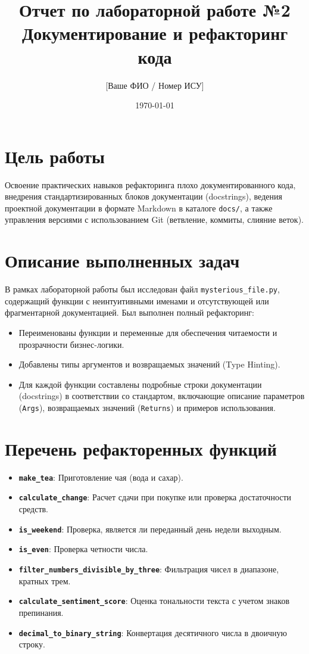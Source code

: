\documentclass[11pt, a4paper]{article}
\title{\textbf{Отчет по лабораторной работе №2}\\Документирование и рефакторинг кода}
\author{[Ваше ФИО / Номер ИСУ]}
\date{\today}
\begin{document}
\maketitle

\section{Цель работы}
Освоение практических навыков рефакторинга плохо документированного кода, внедрения стандартизированных блоков документации (docstrings), ведения проектной документации в формате Markdown в каталоге \texttt{docs/}, а также управления версиями с использованием Git (ветвление, коммиты, слияние веток).

\section{Описание выполненных задач}

В рамках лабораторной работы был исследован файл \texttt{mysterious\_file.py}, содержащий функции с неинтуитивными именами и отсутствующей или фрагментарной документацией. Был выполнен полный рефакторинг:
\begin{itemize}
    \item Переименованы функции и переменные для обеспечения читаемости и прозрачности бизнес-логики.
    \item Добавлены типы аргументов и возвращаемых значений (Type Hinting).
    \item Для каждой функции составлены подробные строки документации (docstrings) в соответствии со стандартом, включающие описание параметров (\texttt{Args}), возвращаемых значений (\texttt{Returns}) и примеров использования.
\end{itemize}

\section{Перечень рефакторенных функций}

\begin{itemize}
    \item \textbf{\texttt{make\_tea}}: Приготовление чая (вода и сахар).
    \item \textbf{\texttt{calculate\_change}}: Расчет сдачи при покупке или проверка достаточности средств.
    \item \textbf{\texttt{is\_weekend}}: Проверка, является ли переданный день недели выходным.
    \item \textbf{\texttt{is\_even}}: Проверка четности числа.
    \item \textbf{\texttt{filter\_numbers\_divisible\_by\_three}}: Фильтрация чисел в диапазоне, кратных трем.
    \item \textbf{\texttt{calculate\_sentiment\_score}}: Оценка тональности текста с учетом знаков препинания.
    \item \textbf{\texttt{decimal\_to\_binary\_string}}: Конвертация десятичного числа в двоичную строку.
\end{itemize}
\end{document}
